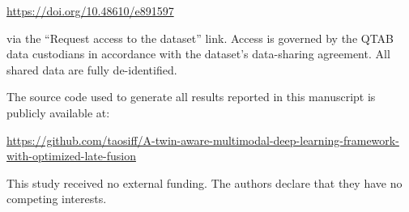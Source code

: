 \documentclass[10pt,letterpaper]{article}
\begin{document}
\begin{center}
\url{https://doi.org/10.48610/e891597}
\end{center}

via the ``Request access to the dataset'' link. Access is governed by the QTAB data custodians in accordance with the dataset's data-sharing agreement. All shared data are fully de-identified.

The source code used to generate all results reported in this manuscript is publicly available at:

\begin{center}
\url{https://github.com/taosiff/A-twin-aware-multimodal-deep-learning-framework-with-optimized-late-fusion}
\end{center}

This study received no external funding. The authors declare that they have no competing interests.
\end{document}
